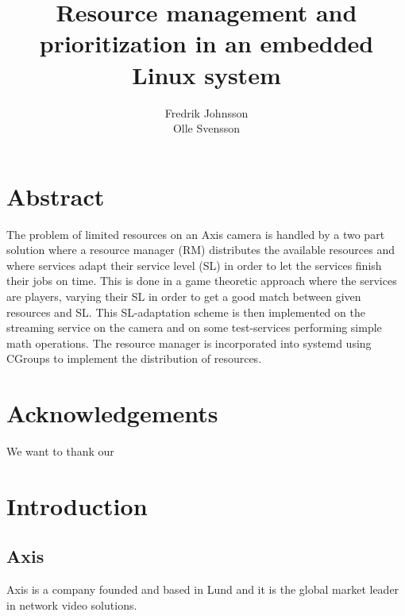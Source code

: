 \documentclass{LTHthesis}
\begin{document}
\begin{titlepages}
\author{Fredrik Johnsson\\Olle Svensson}
\title{Resource management and prioritization in an embedded Linux system}

\end{titlepages}
\setcounter{page}{1}

\chapter*{Abstract}
The problem of limited resources on an Axis camera is handled by a two part solution where a resource manager (RM) distributes the available resources and where services adapt their service level (SL) in order to let the services finish their jobs on time. This is done in a game theoretic approach where the services are players, varying their SL in order to get a good match between given resources and SL. This SL-adaptation scheme is then implemented on the streaming service on the camera and on some test-services performing simple math operations. The resource manager is incorporated into systemd using CGroups to implement the distribution of resources.

\chapter*{Acknowledgements}
We want to thank our 

\newpage
\tableofcontents
\newpage

\setcounter{page}{1}

\chapter{Introduction} %
\section{Axis}
Axis is a company founded and based in Lund and it is the global market leader in network video solutions. 
\end{document}
